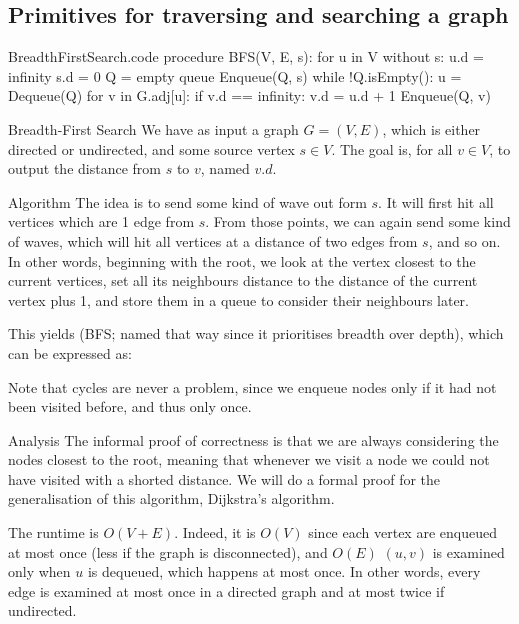 \documentclass[a4paper]{article}
\begin{document}
\subsection{Primitives for traversing and searching a graph}
\begin{filecontents*}[overwrite]{BreadthFirstSearch.code}
procedure BFS(V, E, s):
    for u in V without s:
        u.d = infinity
    s.d = 0
    Q = empty queue
    Enqueue(Q, s)
    while !Q.isEmpty():
        u = Dequeue(Q)
        for v in G.adj[u]:
            if v.d == infinity:
                v.d = u.d + 1
                Enqueue(Q, v)
\end{filecontents*}

\begin{parag}{Breadth-First Search}
    We have as input a graph $G = \left(V, E\right)$, which is either directed or undirected, and some source vertex $s \in V$. The goal is, for all $v \in V$, to output the distance from $s$ to $v$, named $v.d$.

    \begin{subparag}{Algorithm}
        The idea is to send some kind of wave out form $s$. It will first hit all vertices which are 1 edge from $s$. From those points, we can again send some kind of waves, which will hit all vertices at a distance of two edges from $s$, and so on. In other words, beginning with the root, we look at the vertex closest to the current vertices, set all its neighbours distance to the distance of the current vertex plus 1, and store them in a queue to consider their neighbours later. 

        This yields  (BFS; named that way since it prioritises breadth over depth), which can be expressed as:
        
        Note that cycles are never a problem, since we enqueue nodes only if it had not been visited before, and thus only once.
    \end{subparag}

    \begin{subparag}{Analysis}
        The informal proof of correctness is that we are always considering the nodes closest to the root, meaning that whenever we visit a node we could not have visited with a shorted distance. We will do a formal proof for the generalisation of this algorithm, Dijkstra's algorithm.

        The runtime is $O\left(V + E\right)$. Indeed, it is $O\left(V\right)$ since each vertex are enqueued at most once (less if the graph is disconnected), and $O\left(E\right)$ $\left(u, v\right)$ is examined only when $u$ is dequeued, which happens at most once. In other words, every edge is examined at most once in a directed graph and at most twice if undirected.


\end{subparag}
\end{parag}
\end{document}
